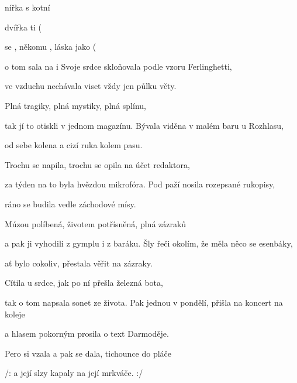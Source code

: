 
\zs
{} nířka s   kotní   

  dvířka  ti
\ifdefined\TPBAND
	(
\fi

 se , někomu ,
láska jako 
\ifdefined\TPBAND
	(
\fi

 o tom sala  na i 
    
\ks
\zs
Svoje srdce skloňovala podle vzoru Ferlinghetti,

ve vzduchu nechávala viset vždy jen půlku věty.

Plná tragiky, plná mystiky,
plná splínu,

tak jí to otiskli v jednom magazínu.
\ks
\zs
Bývala viděna v malém baru u Rozhlasu,

od sebe kolena a cizí ruka kolem pasu.

Trochu se napila, trochu se opila
na účet redaktora,

za týden na to byla hvězdou mikrofóra.
\ks
\zs
Pod paží nosila rozepsané rukopisy,

ráno se budila vedle záchodové mísy.

Múzou políbená, životem potřísněná,
plná zázraků

a pak ji vyhodili z gymplu i z baráku.
\ks
\zs
Šly řeči okolím, že měla něco se esenbáky,

ať bylo cokoliv, přestala věřit na zázraky.

Cítila u srdce, jak po ní přešla
železná bota,

tak o tom napsala sonet ze života.
\ks
\zs
Pak jednou v pondělí, přišla na koncert na koleje

a hlasem pokorným prosila o text Darmoděje.

Pero si vzala a pak se dala,
tichounce do pláče

/: a její slzy kapaly na její mrkváče. :/
\ks
\kp





